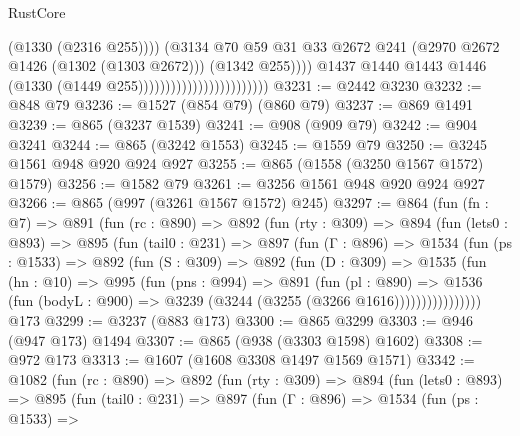 \begin{lexlean}{RustCore}
\begin{coremodule}
{\begin{coremodule}
{{{{{{{{                                                        (@1330 (@2316 @255))))
                                                    (@3134
                                                      @70
                                                      @59
                                                      @31
                                                      @33
                                                      @2672
                                                      @241
                                                      (@2970 @2672 @1426 (@1302 (@1303 @2672)))
                                                      (@1342 @255))))
                                                @1437
                                                @1440
                                                @1443
                                                @1446
                                                (@1330 (@1449 @255))))))))))))))))))))))))
@3231 := @2442 @3230
@3232 := @848 @79
@3236 := @1527 (@854 @79) (@860 @79)
@3237 := @869 @1491
@3239 := @865 (@3237 @1539)
@3241 := @908 (@909 @79)
@3242 := @904 @3241
@3244 := @865 (@3242 @1553)
@3245 := @1559 @79
@3250 := @3245 @1561 @948 @920 @924 @927
@3255 := @865 (@1558 (@3250 @1567 @1572) @1579)
@3256 := @1582 @79
@3261 := @3256 @1561 @948 @920 @924 @927
@3266 := @865 (@997 (@3261 @1567 @1572) @245)
@3297 := @864
    (fun (fn : @7) =>
    @891
      (fun (rc : @890) =>
      @892
        (fun (rty : @309) =>
        @894
          (fun (lets0 : @893) =>
          @895
            (fun (tail0 : @231) =>
            @897
              (fun (Γ : @896) =>
              @1534
                (fun (ps : @1533) =>
                @892
                  (fun (S : @309) =>
                  @892
                    (fun (D : @309) =>
                    @1535
                      (fun (hn : @10) =>
                      @995
                        (fun (pns : @994) =>
                        @891
                          (fun (pl : @890) =>
                          @1536
                            (fun (bodyL : @900) => @3239 (@3244 (@3255 (@3266 @1616))))))))))))))))
    @173
@3299 := @3237 (@883 @173)
@3300 := @865 @3299
@3303 := @946 (@947 @173) @1494
@3307 := @865 (@938 (@3303 @1598) @1602)
@3308 := @972 @173
@3313 := @1607 (@1608 @3308 @1497 @1569 @1571)
@3342 := @1082
    (fun (rc : @890) =>
    @892
      (fun (rty : @309) =>
      @894
        (fun (lets0 : @893) =>
        @895
          (fun (tail0 : @231) =>
          @897
            (fun (Γ : @896) =>
            @1534
              (fun (ps : @1533) =>
}}}}}}}}
\end{coremodule}}
\end{coremodule}
\end{lexlean}
